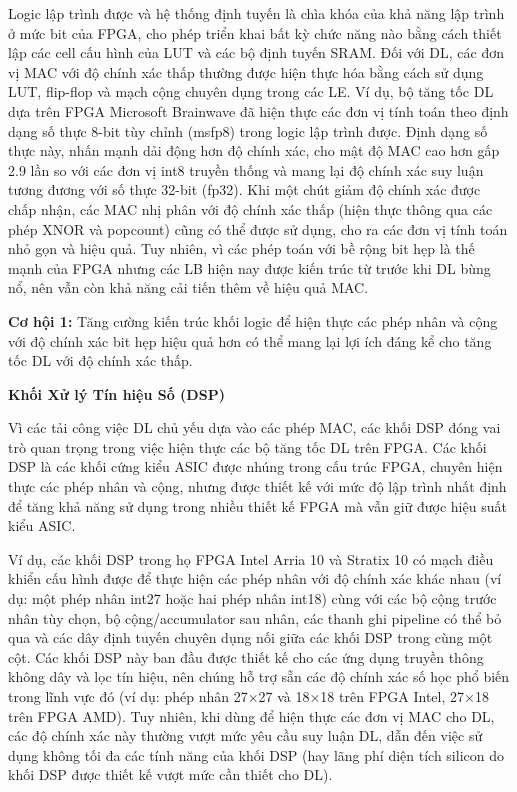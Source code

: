\documentclass[a4paper]{article}
\begin{document}
Logic lập trình được và hệ thống định tuyến là chìa khóa của khả năng lập trình ở mức bit của FPGA, cho phép triển khai bất kỳ chức năng nào bằng cách thiết lập các cell cấu hình của LUT và các bộ định tuyến SRAM. Đối với DL, các đơn vị MAC với độ chính xác thấp thường được hiện thực hóa bằng cách sử dụng LUT, flip-flop và mạch cộng chuyên dụng trong các LE. Ví dụ, bộ tăng tốc DL dựa trên FPGA Microsoft Brainwave đã hiện thực các đơn vị tính toán theo định dạng số thực 8-bit tùy chỉnh (msfp8) trong logic lập trình được. Định dạng số thực này, nhấn mạnh dải động hơn độ chính xác, cho mật độ MAC cao hơn gấp 2.9 lần so với các đơn vị int8 truyền thống và mang lại độ chính xác suy luận tương đương với số thực 32-bit (fp32). Khi một chút giảm độ chính xác được chấp nhận, các MAC nhị phân với độ chính xác thấp (hiện thực thông qua các phép XNOR và popcount) cũng có thể được sử dụng, cho ra các đơn vị tính toán nhỏ gọn và hiệu quả. Tuy nhiên, vì các phép toán với bề rộng bit hẹp là thế mạnh của FPGA nhưng các LB hiện nay được kiến trúc từ trước khi DL bùng nổ, nên vẫn còn khả năng cải tiến thêm về hiệu quả MAC.

\textbf{Cơ hội 1:} Tăng cường kiến trúc khối logic để hiện thực các phép nhân và cộng với độ chính xác bit hẹp hiệu quả hơn có thể mang lại lợi ích đáng kể cho tăng tốc DL với độ chính xác thấp.

\textbf{Khối Xử lý Tín hiệu Số (DSP)}

Vì các tải công việc DL chủ yếu dựa vào các phép MAC, các khối DSP đóng vai trò quan trọng trong việc hiện thực các bộ tăng tốc DL trên FPGA. Các khối DSP là các khối cứng kiểu ASIC được nhúng trong cấu trúc FPGA, chuyên hiện thực các phép nhân và cộng, nhưng được thiết kế với mức độ lập trình nhất định để tăng khả năng sử dụng trong nhiều thiết kế FPGA mà vẫn giữ được hiệu suất kiểu ASIC.

Ví dụ, các khối DSP trong họ FPGA Intel Arria 10 và Stratix 10 có mạch điều khiển cấu hình được để thực hiện các phép nhân với độ chính xác khác nhau (ví dụ: một phép nhân int27 hoặc hai phép nhân int18) cùng với các bộ cộng trước nhân tùy chọn, bộ cộng/accumulator sau nhân, các thanh ghi pipeline có thể bỏ qua và các dây định tuyến chuyên dụng nối giữa các khối DSP trong cùng một cột. Các khối DSP này ban đầu được thiết kế cho các ứng dụng truyền thông không dây và lọc tín hiệu, nên chúng hỗ trợ sẵn các độ chính xác số học phổ biến trong lĩnh vực đó (ví dụ: phép nhân 27×27 và 18×18 trên FPGA Intel, 27×18 trên FPGA AMD). Tuy nhiên, khi dùng để hiện thực các đơn vị MAC cho DL, các độ chính xác này thường vượt mức yêu cầu suy luận DL, dẫn đến việc sử dụng không tối đa các tính năng của khối DSP (hay lãng phí diện tích silicon do khối DSP được thiết kế vượt mức cần thiết cho DL).
\end{document}
